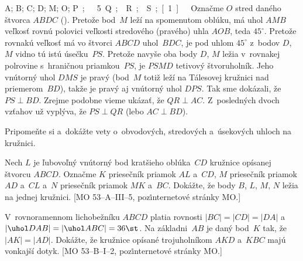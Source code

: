 {%
\fontplace
\trpoint A; \tlpoint B; \blpoint C; \brpoint D;
\bpoint M; \rpoint O;
\rpoint\down\unit P; \lpoint\down.5\unit Q;
\rbpoint R; \lbpoint S;
[1] \hfil\Obr

Označme $O$ stred daného štvorca $ABDC$ (\obr).
Pretože bod~$M$ leží na spomenutom oblúku, má uhol $AMB$ veľkosť
rovnú polovici veľkosti stredového (pravého) uhla $AOB$,
teda $45^{\circ}$.
\inspicture{}
Pretože rovnakú veľkosť má vo štvorci $ABCD$ uhol~$BDC$,
je pod uhlom
$45^{\circ}$ z~bodov $D$, $M$ vidno tú istú úsečku~$PS$.
Pretože navyše
oba body $D$, $M$ ležia v~rovnakej polrovine s~hraničnou priamkou~$PS$,
je $PSMD$ tetivový štvoruholník. Jeho vnútorný uhol $DMS$ je pravý
(bod~$M$ totiž leží na Tálesovej kružnici nad priemerom~$BD$),
takže je pravý aj vnútorný uhol $DPS$. Tak sme dokázali, že
$PS\perp BD$. Zrejme podobne vieme ukázať, že $QR\perp AC$.
Z~posledných dvoch vzťahov už vyplýva, že $PS\perp QR$ (lebo
$AC\perp BD$).

Pripomeňte si a~dokážte vety o~obvodových, stredových a~úsekových
uhloch na kružnici.

Nech $L$ je ľubovoľný vnútorný bod kratšieho oblúka~$CD$ kružnice
opísanej štvorcu $ABCD$. Označme $K$ priesečník priamok $AL$ a~$C\!D$,
$M$ priesečník priamok $AD$ a~$CL$ a~$N$ priesečník priamok $MK$
a~$BC$. Dokážte, že body $B$, $L$, $M$, $N$ ležia na jednej
kružnici. [MO 53--A--III--5, poz\. internetové stránky MO.]

V~rovnoramennom lichobežníku $ABCD$ platia rovnosti
$|BC|=|CD|=|DA|$ a $|\uhol DAB|=|\uhol ABC|=36\st$. Na základni~$AB$
je daný bod~$K$ tak, že $|AK|=|AD|$. Dokážte, že kružnice
opísané trojuholníkom $AKD$ a~$KBC$ majú vonkajší dotyk. [MO 53--B--I--2, poz\.
internetové stránky MO.]
}

